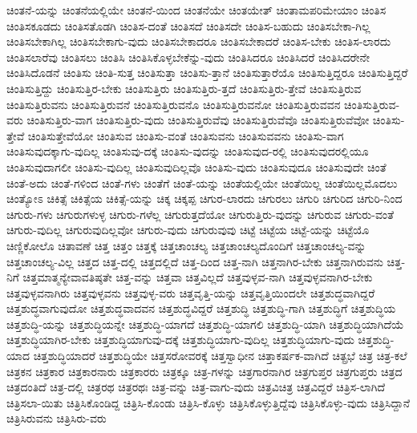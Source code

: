 {ಚಿಂತನೆ-ಯನ್ನು
ಚಿಂತನೆಯಲ್ಲಿಯೇ
ಚಿಂತನೆ-ಯಿಂದ
ಚಿಂತನೆಯೇ
ಚಿಂತಯೇತ್
ಚಿಂತಾಮಪರಿಮೇಯಾಂ
ಚಿಂತಿಸ
ಚಿಂತಿಸಕೂಡದು
ಚಿಂತಿಸತೊಡಗಿ
ಚಿಂತಿಸ-ದಂತೆ
ಚಿಂತಿಸದೆ
ಚಿಂತಿಸದೇ
ಚಿಂತಿಸ-ಬಹುದು
ಚಿಂತಿಸಬೇಕಾ-ಗಿಲ್ಲ
ಚಿಂತಿಸಬೇಕಾಗಿಲ್ಲ
ಚಿಂತಿಸಬೇಕಾಗು-ವುದು
ಚಿಂತಿಸಬೇಕಾದರೂ
ಚಿಂತಿಸಬೇಕಾದರೆ
ಚಿಂತಿಸ-ಬೇಕು
ಚಿಂತಿಸ-ಲಾರದು
ಚಿಂತಿಸಲಾರೆವು
ಚಿಂತಿಸಲು
ಚಿಂತಿಸಿ
ಚಿಂತಿಸಿಕೊಳ್ಳಬೇಕೆನ್ನು-ವುದು
ಚಿಂತಿಸಿದರೂ
ಚಿಂತಿಸಿದರೆ
ಚಿಂತಿಸಿದರೇನೇ
ಚಿಂತಿಸಿದೊಡನೆ
ಚಿಂತಿಸು
ಚಿಂತಿ-ಸುತ್ತ
ಚಿಂತಿಸುತ್ತಾ
ಚಿಂತಿಸು-ತ್ತಾನೆ
ಚಿಂತಿಸುತ್ತಾರೆಯೊ
ಚಿಂತಿಸುತ್ತಿದ್ದರೂ
ಚಿಂತಿಸುತ್ತಿದ್ದರೆ
ಚಿಂತಿಸುತ್ತಿದ್ದು
ಚಿಂತಿಸುತ್ತಿರ-ಬೇಕು
ಚಿಂತಿಸುತ್ತಿರು
ಚಿಂತಿಸುತ್ತಿರು-ತ್ತದೆ
ಚಿಂತಿಸುತ್ತಿರು-ತ್ತೇವೆ
ಚಿಂತಿಸುತ್ತಿರುವ
ಚಿಂತಿಸುತ್ತಿರುವನು
ಚಿಂತಿಸುತ್ತಿರುವನೆ
ಚಿಂತಿಸುತ್ತಿರುವನೊ
ಚಿಂತಿಸುತ್ತಿರುವನೋ
ಚಿಂತಿಸುತ್ತಿರುವವನ
ಚಿಂತಿಸುತ್ತಿರುವ-ವರು
ಚಿಂತಿಸುತ್ತಿರು-ವಾಗ
ಚಿಂತಿಸುತ್ತಿರು-ವುದು
ಚಿಂತಿಸುತ್ತಿರುವೆವು
ಚಿಂತಿಸುತ್ತಿರುವೆವೊ
ಚಿಂತಿಸುತ್ತಿರುವೆವೋ
ಚಿಂತಿಸು-ತ್ತೇವೆ
ಚಿಂತಿಸುತ್ತೇವೆಯೋ
ಚಿಂತಿಸುವ
ಚಿಂತಿಸು-ವಂತೆ
ಚಿಂತಿಸುವನು
ಚಿಂತಿಸುವವನು
ಚಿಂತಿಸು-ವಾಗ
ಚಿಂತಿಸುವುದಕ್ಕಾಗು-ವುದಿಲ್ಲ
ಚಿಂತಿಸುವು-ದಕ್ಕೆ
ಚಿಂತಿಸು-ವುದನ್ನು
ಚಿಂತಿಸುವುದ-ರಲ್ಲಿ
ಚಿಂತಿಸುವುದರಲ್ಲಿಯೂ
ಚಿಂತಿಸುವುದಾಗಲೀ
ಚಿಂತಿಸು-ವುದಿಲ್ಲ
ಚಿಂತಿಸುವುದಿಲ್ಲವೊ
ಚಿಂತಿಸು-ವುದು
ಚಿಂತಿಸುವುದೂ
ಚಿಂತಿಸುವುದೇ
ಚಿಂತೆ
ಚಿಂತೆ-ಅದು
ಚಿಂತೆ-ಗಳಿಂದ
ಚಿಂತೆ-ಗಳು
ಚಿಂತೆಗೆ
ಚಿಂತೆ-ಯನ್ನು
ಚಿಂತೆಯಲ್ಲಿಯೇ
ಚಿಂತೆಯಿಲ್ಲ
ಚಿಂತೆಯಿಲ್ಲಮೊದಲು
ಚಿಂತ್ಯೋಽ
ಚಿಕಿತ್ಸೆ
ಚಿಕಿತ್ಸೆಯ
ಚಿಕಿತ್ಸೆ-ಯನ್ನು
ಚಿಕ್ಕ
ಚಿಕ್ಕಪ್ಪ
ಚಿಗುರ-ಲಾರದು
ಚಿಗುರಲು
ಚಿಗುರಿ
ಚಿಗುರಿದ
ಚಿಗುರಿ-ನಿಂದ
ಚಿಗುರು-ಗಳು
ಚಿಗುರುಗಳುಳ್ಳ
ಚಿಗುರು-ಗಳೆಲ್ಲ
ಚಿಗುರುತ್ತದೆಯೋ
ಚಿಗುರುತ್ತಿರು-ವುದನ್ನು
ಚಿಗುರುವ
ಚಿಗುರು-ವಂತೆ
ಚಿಗುರು-ವುದಿಲ್ಲ
ಚಿಗುರುವುದಿಲ್ಲವೋ
ಚಿಗುರು-ವುದು
ಚಿಗುರುವುವು
ಚಿಟ್ಟೆ
ಚಿಟ್ಟೆಯ
ಚಿಟ್ಟೆ-ಯನ್ನು
ಚಿಟ್ಟೆಯೊ
ಚಿಣ್ಣಿಕೋಲೊ
ಚಿತಾವಣೆ
ಚಿತ್ತ
ಚಿತ್ತಂ
ಚಿತ್ತಕ್ಕೆ
ಚಿತ್ತಚಾಂಚಲ್ಯ
ಚಿತ್ತಚಾಂಚಲ್ಯದೊಂದಿಗೆ
ಚಿತ್ತಚಾಂಚಲ್ಯ-ವನ್ನು
ಚಿತ್ತಚಾಂಚಲ್ಯ-ವಿಲ್ಲ
ಚಿತ್ತದ
ಚಿತ್ತ-ದಲ್ಲಿ
ಚಿತ್ತದಲ್ಲಿದೆ
ಚಿತ್ತ-ದಿಂದ
ಚಿತ್ತ-ನಾಗಿ
ಚಿತ್ತನಾಗಿರ-ಬೇಕು
ಚಿತ್ತನಾಗಿರುವನು
ಚಿತ್ತ-ನಿಗೆ
ಚಿತ್ತಮಾತ್ಮನ್ಯೇವಾವತಿಷ್ಠತೇ
ಚಿತ್ತ-ವನ್ನು
ಚಿತ್ತವಾ
ಚಿತ್ತವಿಲ್ಲದೆ
ಚಿತ್ತವುಳ್ಳವ-ನಾಗಿ
ಚಿತ್ತವುಳ್ಳವನಾಗಿರ-ಬೇಕು
ಚಿತ್ತವುಳ್ಳವನಾಗಿರು
ಚಿತ್ತವುಳ್ಳವನು
ಚಿತ್ತವುಳ್ಳ-ವರು
ಚಿತ್ತವೃತ್ತಿ-ಯನ್ನು
ಚಿತ್ತವೃತ್ತಿಯಿಂದಲೇ
ಚಿತ್ತಶುದ್ಧವಾಗಿದ್ದರೆ
ಚಿತ್ತಶುದ್ಧವಾಗುವುದೋ
ಚಿತ್ತಶುದ್ಧವಾದವನ
ಚಿತ್ತಶುದ್ಧವಿದ್ದರೆ
ಚಿತ್ತಶುದ್ಧಿ
ಚಿತ್ತಶುದ್ಧಿ-ಗಾಗಿ
ಚಿತ್ತಶುದ್ಧಿಗೆ
ಚಿತ್ತಶುದ್ಧಿಯ
ಚಿತ್ತಶುದ್ಧಿ-ಯನ್ನು
ಚಿತ್ತಶುದ್ಧಿಯನ್ನೇ
ಚಿತ್ತಶುದ್ಧಿ-ಯಾಗದೆ
ಚಿತ್ತಶುದ್ಧಿ-ಯಾಗಲಿ
ಚಿತ್ತಶುದ್ಧಿ-ಯಾಗಿ
ಚಿತ್ತಶುದ್ಧಿಯಾಗಿದೆಯೆ
ಚಿತ್ತಶುದ್ಧಿಯಾಗಿರ-ಬೇಕು
ಚಿತ್ತಶುದ್ಧಿಯಾಗುವು-ದಕ್ಕೆ
ಚಿತ್ತಶುದ್ಧಿಯಾಗು-ವುದಿಲ್ಲ
ಚಿತ್ತಶುದ್ಧಿಯಾಗು-ವುದು
ಚಿತ್ತಶುದ್ಧಿ-ಯಾದ
ಚಿತ್ತಶುದ್ಧಿಯಾದರೆ
ಚಿತ್ತಶುದ್ಧಿಯೇ
ಚಿತ್ತಸರೋವರಕ್ಕೆ
ಚಿತ್ತಸ್ವಾಧೀನ
ಚಿತ್ತಾಕರ್ಷಕ-ವಾಗಿದೆ
ಚಿತ್ಪ್ರಭೆ
ಚಿತ್ರ
ಚಿತ್ರ-ಕಲೆ
ಚಿತ್ರಕನ
ಚಿತ್ರಕಾರ
ಚಿತ್ರಕಾರನಾರು
ಚಿತ್ರಕಾರರು
ಚಿತ್ರಕ್ಕೂ
ಚಿತ್ರ-ಗಳನ್ನು
ಚಿತ್ರಗಾರನಾಗಿರ
ಚಿತ್ರಗುಪ್ತರ
ಚಿತ್ರಗುಪ್ತರು
ಚಿತ್ರದ
ಚಿತ್ರದಂತಿದೆ
ಚಿತ್ರ-ದಲ್ಲಿ
ಚಿತ್ರರಥ
ಚಿತ್ರರಥಃ
ಚಿತ್ರ-ವನ್ನು
ಚಿತ್ರ-ವಾಗು-ವುದು
ಚಿತ್ರವಿಚಿತ್ರ
ಚಿತ್ರವಿದ್ದರೆ
ಚಿತ್ರಿಸ-ಲಾಗಿದೆ
ಚಿತ್ರಿಸಲಾ-ಯಿತು
ಚಿತ್ರಿಸಿಕೊಂಡಿದ್ದ
ಚಿತ್ರಿಸಿ-ಕೊಂಡು
ಚಿತ್ರಿಸಿ-ಕೊಳ್ಳು
ಚಿತ್ರಿಸಿಕೊಳ್ಳುತ್ತಿದ್ದೆವು
ಚಿತ್ರಿಸಿಕೊಳ್ಳು-ವುದು
ಚಿತ್ರಿಸಿದ್ದಾನೆ
ಚಿತ್ರಿಸಿರುವನು
ಚಿತ್ರಿಸಿರು-ವರು
}
